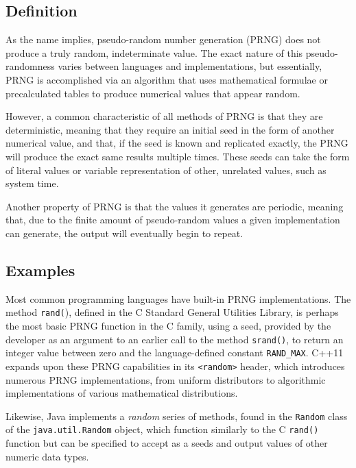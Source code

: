 \subsection{Definition}
As the name implies, pseudo-random number generation (PRNG) does not produce a truly random, indeterminate value. The exact nature of this pseudo-randomness varies between languages and implementations, but essentially, PRNG is accomplished via an algorithm that uses mathematical formulae or precalculated tables to produce numerical values that appear random.\autocite{20210517:haahr}

However, a common characteristic of all methods of PRNG is that they are deterministic, meaning that they require an initial seed in the form of another numerical value, and that, if the seed is known and replicated exactly, the PRNG will produce the exact same results multiple times. These seeds can take the form of literal values or variable representation of other, unrelated values, such as system time.

Another property of PRNG is that the values it generates are periodic, meaning that, due to the finite amount of pseudo-random values a given implementation can generate, the output will eventually begin to repeat.

\subsection{Examples}
Most common programming languages have built-in PRNG implementations. The method \texttt{rand(}), defined in the C Standard General Utilities Library, is perhaps the most basic PRNG function in the C family, using a seed, provided by the developer as an argument to an earlier call to the method \texttt{srand()}, to return an integer value between zero and the language-defined constant \texttt{RAND\_MAX}.\autocite{20210517:cpp-rand} C++11 expands upon these PRNG capabilities in its \texttt{<random>} header, which introduces numerous PRNG implementations, from uniform distributors to algorithmic implementations of various mathematical distributions.\autocite{20210517:cpp-random}

Likewise, Java implements a \textit{random} series of methods, found in the \texttt{Random} class of the \texttt{java.util.Random} object, which function similarly to the C \texttt{rand()} function but can be specified to accept as a seeds and output values of other numeric data types.\autocite{20210517:java}

